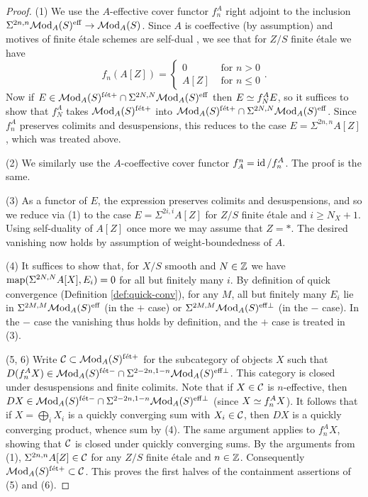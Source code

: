 \documentclass{amsart}
\numberwithin{proposition}{section}
\numberwithin{equation}{section}
\def\fet{\mathrm{f\acute et}}
\begin{document}
\begin{proof}
(1)
We use the $A$-effective cover functor $f_n^A$ right adjoint to the inclusion $\Sigma^{2n,n}\mathcal{M}\mathrm{od}_A(S)^{\mathrm{eff}} \to \mathcal{M}\mathrm{od}_A(S)$.
Since $A$ is coeffective (by assumption) and motives of finite étale schemes are self-dual \cite[Proposition~2.4.31]{triangulated-mixed-motives}, we see that for $Z/S$ finite étale we have \[ f_n(A[Z]) = \begin{cases} 0 & \text{ for } n > 0 \\  A[Z] & \text{ for } n \le 0 \end{cases}. \]
Now if $E \in \Mod_A(S)^{\fet+} \cap \Sigma^{2N,N} \Mod_A(S)^{\eff}$ then $E \simeq f_N^A E$, so it suffices to show that $f_N^A$ takes $\Mod_A(S)^{\fet+}$ into $\Mod_A(S)^{\fet+} \cap \Sigma^{2N,N} \Mod_A(S)^{\eff}$.
Since $f_n^A$ preserves colimits and desuspensions, this reduces to the case $E = \Sigma^{2n,n} A[Z]$, which was treated above.

(2)
We similarly use the $A$-coeffective cover functor $f^n_A = \operatorname{id}/f_n^A$.
The proof is the same.

(3) As a functor of $E$, the expression preserves colimits and desuspensions, and so we reduce via (1) to the case $E=\Sigma^{2i,i} A[Z]$ for $Z/S$ finite étale and $i \ge N_X+1$.
Using self-duality of $A[Z]$ once more we may assume that $Z=*$.
The desired vanishing now holds by assumption of weight-boundedness of $A$.

(4) It suffices to show that, for $X/S$ smooth and $N \in \mathbb{Z}$ we have $\mathrm{map}(\Sigma^{2N,N}A[X], E_i) = 0$ for all but finitely many $i$.
By definition of quick convergence (Definition \ref{def:quick-conv}), for any $M$, all but finitely many $E_i$ lie in $\Sigma^{2M,M}\mathcal{M}\mathrm{od}_A(S)^{\mathrm{eff}}$ (in the $+$ case) or $\Sigma^{2M,M}\mathcal{M}\mathrm{od}_A(S)^{{\mathrm{eff}}\perp}$ (in the $-$ case).
In the $-$ case the vanishing thus holds by definition, and the $+$ case is treated in (3).

(5, 6) Write $\scr C \subset \Mod_A(S)^{\fet+}$ for the subcategory of objects $X$ such that $D(f_n^A X) \in \Mod_A(S)^{\fet-} \cap \Sigma^{2-2n,1-n} \Mod_A(S)^{\eff\perp}$.
This category is closed under desuspensions and finite colimits.
Note that if $X \in \mathcal C$ is $n$-effective, then $DX \in \Mod_A(S)^{\fet-} \cap \Sigma^{2-2n,1-n} \Mod_A(S)^{\eff\perp}$ (since $X \simeq f_n^A X$).
It follows that if $X = \bigoplus_i X_i$ is a quickly converging sum with $X_i \in \mathcal C$, then $DX$ is a quickly converging product, whence sum by (4).
The same argument applies to $f_n^A X$, showing that $\mathcal C$ is closed under quickly converging sums.
By the arguments from (1), $\Sigma^{2n,n} A[Z] \in \mathcal C$ for any $Z/S$ finite étale and $n \in \mathbb{Z}$.
Consequently $\Mod_A(S)^{\fet+} \subset \scr C$.
This proves the first halves of the containment assertions of (5) and (6).


\end{proof}
\end{document}
